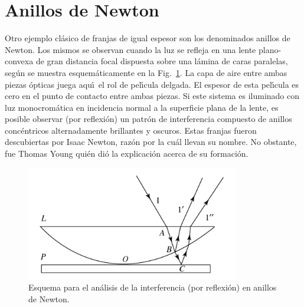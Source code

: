 \documentclass[a4paper]{article}
\begin{document}

\section{Anillos de Newton}

Otro ejemplo cl\'asico de franjas de igual espesor son los denominados
anillos de Newton. Los mismos se observan cuando la luz se refleja en una
lente plano-convexa de gran distancia focal dispuesta sobre una l\'amina 
de caras paralelas, seg\'un se muestra esquem\'aticamente en la 
Fig.~\ref{fig:anillos}. La capa de aire entre ambas piezas 
\'opticas juega aqu\'\i\ el rol de pel\'\i cula delgada. El espesor de esta
pel\'\i cula es cero en el punto de contacto entre ambas piezas. Si este 
sistema es iluminado con luz monocrom\'atica en incidencia normal a la 
superficie plana de la lente, es posible observar (por reflexi\'on) un patr\'on
de interferencia compuesto de anillos conc\'entricos alternadamente brillantes 
y oscuros. Estas franjas fueron descubiertas por Isaac Newton, raz\'on por la
cu\'al llevan su nombre. No obstante, fue Thomas Young qui\'en di\'o la 
explicaci\'on acerca de su formaci\'on.  

\begin{figure}[ht]
\centering
\includegraphics[height=5cm]{anillos.png}
\caption{Esquema para el an\'alisis de la interferencia (por reflexi\'on)
en anillos de Newton.}
\label{fig:anillos}
\end{figure}
\end{document}
